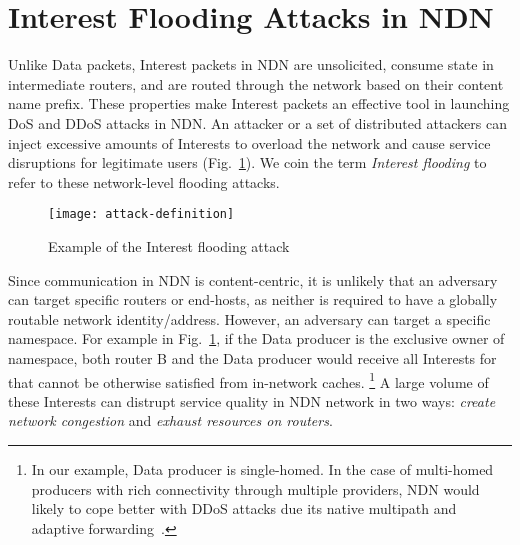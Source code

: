 \section{Interest Flooding Attacks in NDN}
\label{sec:interest-flooding}




Unlike Data packets, Interest packets in NDN are unsolicited, consume state in intermediate routers, and are routed through the network based on their content name prefix. These properties make Interest packets an effective tool in launching DoS and DDoS attacks in NDN. An attacker or a set of distributed attackers can inject excessive amounts of Interests to overload the network and cause service disruptions for legitimate users (Fig.~\ref{fig:flooding example}). We coin the term \emph{Interest flooding} to refer to these network-level flooding attacks.

\begin{figure}[htbp]
  \centering
  \texttt{[image: attack-definition]}
  \caption{Example of the Interest flooding attack}
  \label{fig:flooding example}
\end{figure}


Since communication in NDN is content-centric, it is unlikely that an adversary can target specific routers or end-hosts, as neither is required to have a globally routable network identity/address. However, an adversary can target a specific namespace.
For example in Fig.~\ref{fig:flooding example}, if the Data producer is the exclusive owner of  namespace, both router B and the Data producer would receive all Interests for  that cannot be otherwise satisfied from in-network caches.%
\footnote {In our example, Data producer is single-homed. In the case of multi-homed producers with rich connectivity through multiple providers, NDN would likely to cope better with DDoS attacks due its native multipath and adaptive forwarding~\cite{adaptive-forwarding}.}
A large volume of these Interests can distrupt service quality in NDN network in two ways: \emph{create network congestion} and \emph{exhaust resources on routers}.

